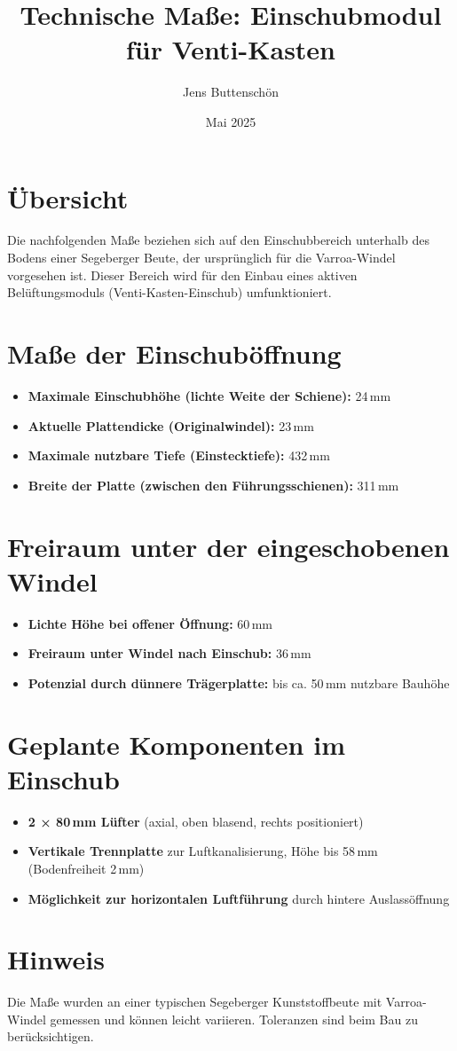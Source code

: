 \documentclass[a4paper,11pt]{article}
\title{Technische Maße: Einschubmodul für Venti-Kasten}
\author{Jens Buttenschön}
\date{Mai 2025}
\begin{document}
\maketitle

\section*{Übersicht}
Die nachfolgenden Maße beziehen sich auf den Einschubbereich unterhalb des Bodens einer Segeberger Beute, der ursprünglich für die Varroa-Windel vorgesehen ist. Dieser Bereich wird für den Einbau eines aktiven Belüftungsmoduls (Venti-Kasten-Einschub) umfunktioniert.

\section*{Maße der Einschuböffnung}
\begin{itemize}[label=--]
  \item \textbf{Maximale Einschubhöhe (lichte Weite der Schiene):} 24\,mm
  \item \textbf{Aktuelle Plattendicke (Originalwindel):} 23\,mm
  \item \textbf{Maximale nutzbare Tiefe (Einstecktiefe):} 432\,mm
  \item \textbf{Breite der Platte (zwischen den Führungsschienen):} 311\,mm
\end{itemize}

\section*{Freiraum unter der eingeschobenen Windel}
\begin{itemize}[label=--]
  \item \textbf{Lichte Höhe bei offener Öffnung:} 60\,mm
  \item \textbf{Freiraum unter Windel nach Einschub:} 36\,mm
  \item \textbf{Potenzial durch dünnere Trägerplatte:} bis ca. 50\,mm nutzbare Bauhöhe
\end{itemize}

\section*{Geplante Komponenten im Einschub}
\begin{itemize}[label=--]
  \item \textbf{2 × 80\,mm Lüfter} (axial, oben blasend, rechts positioniert)
  \item \textbf{Vertikale Trennplatte} zur Luftkanalisierung, Höhe bis 58\,mm (Bodenfreiheit 2\,mm)
  \item \textbf{Möglichkeit zur horizontalen Luftführung} durch hintere Auslassöffnung
\end{itemize}

\section*{Hinweis}
Die Maße wurden an einer typischen Segeberger Kunststoffbeute mit Varroa-Windel gemessen und können leicht variieren. Toleranzen sind beim Bau zu berücksichtigen.
\end{document}
